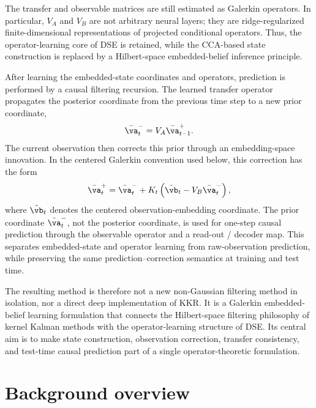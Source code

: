 \documentclass[twoside,11pt]{article}
\begin{document}
The transfer and observable matrices are still estimated as Galerkin
operators. In particular, $V_A$ and $V_B$ are not arbitrary neural
layers; they are ridge-regularized finite-dimensional representations of
projected conditional operators. Thus, the operator-learning core of DSE
is retained, while the CCA-based state construction is replaced by a
Hilbert-space embedded-belief inference principle.

After learning the embedded-state coordinates and operators, prediction
is performed by a causal filtering recursion. The learned transfer
operator propagates the posterior coordinate from the previous time step
to a new prior coordinate,
\begin{align}
\bar{\va}_t^-
=
V_A \bar{\va}_{t-1}^+ .
\label{eq:motivation_test_prior}
\end{align}
The current observation then corrects this prior through an
embedding-space innovation. In the centered Galerkin convention used
below, this correction has the form
\begin{align}
\bar{\va}_t^+
=
\bar{\va}_t^-
+
K_t
\left(
\tilde{\vb}_t - V_B\bar{\va}_t^-
\right),
\label{eq:motivation_test_posterior}
\end{align}
where $\tilde{\vb}_t$ denotes the centered observation-embedding
coordinate. The prior coordinate $\bar{\va}_t^-$, not the posterior
coordinate, is used for one-step causal prediction through the
observable operator and a read-out / decoder map. This separates
embedded-state and operator learning from raw-observation prediction,
while preserving the same prediction--correction semantics at training
and test time.

The resulting method is therefore not a new non-Gaussian filtering
method in isolation, nor a direct deep implementation of KKR. It is a
Galerkin embedded-belief learning formulation that connects the
Hilbert-space filtering philosophy of kernel Kalman methods with the
operator-learning structure of DSE. Its central aim is to make state
construction, observation correction, transfer consistency, and
test-time causal prediction part of a single operator-theoretic
formulation.


\section{Background overview}
\label{sec:background}
\end{document}
